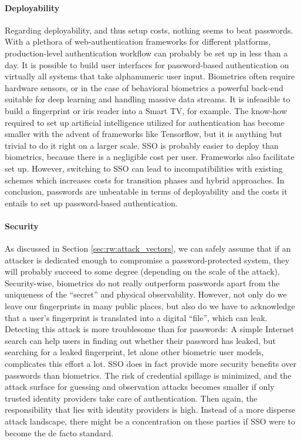 \paragraph{Deployability} 
Regarding deployability, and thus setup costs, nothing seems to beat passwords. With a plethora of web-authentication frameworks for different platforms, production-level authentication workflow can probably be set up in less than a day. It is possible to build user interfaces for password-based authentication on virtually all systems that take alphanumeric user input. Biometrics often require hardware sensors, or in the case of behavioral biometrics a powerful back-end suitable for deep learning and handling massive data streams. It is infeasible to build a fingerprint or iris reader into a Smart TV, for example. The know-how required to set up artificial intelligence utilized for authentication has become smaller with the advent of frameworks like Tensorflow, but it is anything but trivial to do it right on a larger scale. SSO is probably easier to deploy than biometrics, because there is a negligible cost per user. Frameworks also facilitate set up. However, switching to SSO can lead to incompatibilities with existing schemes which increases costs for transition phases and hybrid approaches. In conclusion, passwords are unbeatable in terms of deployability and the costs it entails to set up password-based authentication. 

\paragraph{Security}
As discussed in Section \ref{sec:rw:attack_vectors}, we can safely assume that if an attacker is dedicated enough to compromise a password-protected system, they will probably succeed to some degree (depending on the scale of the attack). Security-wise, biometrics do not really outperform passwords apart from the uniqueness of the ``secret'' and physical observability. However, not only do we leave our fingerprints in many public places, but also do we have to acknowledge that a user's fingerprint is translated into a digital ``file'', which can leak. Detecting this attack is more troublesome than for passwords: A simple Internet search can help users in finding out whether their password has leaked, but searching for a leaked fingerprint, let alone other biometric user models, complicates this effort a lot. SSO does in fact provide more security benefits over passwords than biometrics. The risk of credential spillage is minimized, and the attack surface for guessing and observation attacks becomes smaller if only trusted identity providers take care of authentication. Then again, the responsibility that lies with identity providers is high. Instead of a more disperse attack landscape, there might be a concentration on these parties if SSO were to become the de facto standard.

